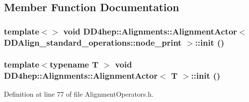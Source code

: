 \subsection{Member Function Documentation}
\hypertarget{class_d_d4hep_1_1_alignments_1_1_alignment_actor_aed1000b7bcf5cf2248311fff6ccc89f6}{
\subsubsection[{init}]{\setlength{\rightskip}{0pt plus 5cm}template$<$$>$ void {\bf DD4hep::Alignments::AlignmentActor}$<$ DDAlign\_\-standard\_\-operations::node\_\-print $>$::init ()}}
\label{class_d_d4hep_1_1_alignments_1_1_alignment_actor_aed1000b7bcf5cf2248311fff6ccc89f6}
\hypertarget{class_d_d4hep_1_1_alignments_1_1_alignment_actor_a594062a18b6bedd5dfb66abd663bf42e}{
\subsubsection[{init}]{\setlength{\rightskip}{0pt plus 5cm}template$<$typename T $>$ void {\bf DD4hep::Alignments::AlignmentActor}$<$ {\bf T} $>$::init ()}}
\label{class_d_d4hep_1_1_alignments_1_1_alignment_actor_a594062a18b6bedd5dfb66abd663bf42e}


Definition at line 77 of file AlignmentOperators.h.

